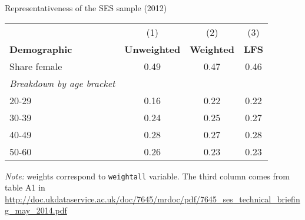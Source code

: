 \begin{center}
\begin{threeparttable}[!h]
\caption{Representativeness of the SES sample (2012)}
\begin{tabular}{lccc}
\toprule
\toprule
&\multicolumn{1}{c}{(1)}&\multicolumn{1}{c}{(2)}&\multicolumn{1}{c}{(3)} \\
\textbf{Demographic}&\multicolumn{1}{c}{\textbf{Unweighted}}&\multicolumn{1}{c}{\textbf{Weighted}}&\multicolumn{1}{c}{\textbf{LFS}} \\
\midrule
Share female           	     &        0.49&        0.47 & 0.46\\

\textit{Breakdown by age bracket}\\
\hspace{3mm}   20-29         &        0.16&        0.22& 0.22\\
\hspace{3mm}   30-39 		&        0.24&        0.25& 0.27\\
\hspace{3mm}   40-49        &        0.28&        0.27& 0.28\\
\hspace{3mm}   50-60           &        0.26&        0.23& 0.23\\
\bottomrule
\bottomrule
\end{tabular}
\begin{tablenotes}
	\item \footnotesize{\textit{Note:} weights correspond to \texttt{weightall} variable. The third column comes from table A1 in \url{http://doc.ukdataservice.ac.uk/doc/7645/mrdoc/pdf/7645_ses_technical_briefing_may_2014.pdf}}
\end{tablenotes}
\end{threeparttable}
\end{center}

